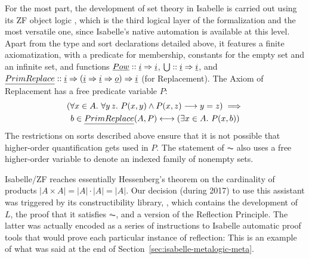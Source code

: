 For the most part, the development of set theory in Isabelle is
carried out using its ZF object logic
\cite{DBLP:journals/jar/PaulsonG96}, which is the third logical layer
of the formalization and the most versatile one, since 
Isabelle's native automation is available at this level. Apart from
the type and sort
declarations detailed above, it features a finite axiomatization,
with a predicate for membership, constants for the empty set and an
infinite set, and functions $\isa{Pow}::\tyi\fun\tyi$,
$\union::\tyi\fun\tyi$, and $\isa{PrimReplace} :: \tyi \fun (\tyi
\fun \tyi \fun\tyo)\fun \tyi$ (for Replacement). The Axiom of
Replacement
has a free predicate variable $P$: %
\begin{multline*}
  (\forall x \in A .\ \forall y\, z.\ P(x, y) \wedge P(x, z)
  \longrightarrow y=z) \implies \\
  b \in \isa{PrimReplace}(A, P)
  \longleftrightarrow(\exists x \in A .\ P(x, b)) 
\end{multline*}
The restrictions on sorts described above ensure that it is not
possible that higher-order quantification gets used in $P$. The
statement of $\AC$ also uses a free higher-order variable to denote
an indexed family of nonempty sets. %

Isabelle/ZF reaches essentially Hessenberg's theorem on the
cardinality of products $|A\times A|=|A|\cdot|A| = |A|$. Our decision
(during 2017) to
use this assistant was triggered by its constructibility
library,  \citep{paulson_2003},
which contains the development of $L$, the proof that it satisfies
$\AC$, and a version of the Reflection Principle. The latter was
actually encoded as a series of instructions to Isabelle automatic
proof tools that would prove each particular instance of reflection:
This is an example of what was said at the end of Section~\ref{sec:isabelle-metalogic-meta}.

